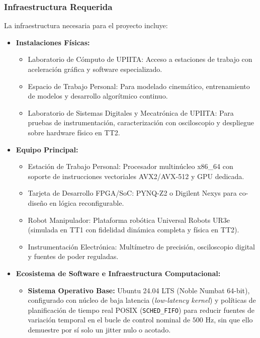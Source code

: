 \documentclass[12pt]{article}
\begin{document}
\subsubsection*{Infraestructura Requerida}
\label{sssec:infraestructura_requerida_listas}
La infraestructura necesaria para el proyecto incluye:

\begin{itemize}
    \item \textbf{Instalaciones Físicas:}
        \begin{itemize}
            \item Laboratorio de Cómputo de UPIITA: Acceso a estaciones de trabajo con aceleración gráfica y software especializado.
            \item Espacio de Trabajo Personal: Para modelado cinemático, entrenamiento de modelos y desarrollo algorítmico continuo.
            \item Laboratorio de Sistemas Digitales y Mecatrónica de UPIITA: Para pruebas de instrumentación, caracterización con osciloscopio y despliegue sobre hardware físico en TT2.
        \end{itemize}
    \item \textbf{Equipo Principal:}
        \begin{itemize}
            \item Estación de Trabajo Personal: Procesador multinúcleo x86\_64 con soporte de instrucciones vectoriales AVX2/AVX-512 y GPU dedicada.
            \item Tarjeta de Desarrollo FPGA/SoC: PYNQ-Z2 o Digilent Nexys para co-diseño en lógica reconfigurable.
            \item Robot Manipulador: Plataforma robótica Universal Robots UR3e (simulada en TT1 con fidelidad dinámica completa y física en TT2).
            \item Instrumentación Electrónica: Multímetro de precisión, osciloscopio digital y fuentes de poder reguladas.
        \end{itemize}
    \item \textbf{Ecosistema de Software e Infraestructura Computacional:}
        \begin{itemize}
            \item \textbf{Sistema Operativo Base:} Ubuntu 24.04 LTS (Noble Numbat 64-bit), configurado con núcleo de baja latencia (\textit{low-latency kernel}) y políticas de planificación de tiempo real POSIX (\texttt{SCHED\_FIFO}) para reducir fuentes de variación temporal en el bucle de control nominal de $500\text{ Hz}$, sin que ello demuestre por sí solo un jitter nulo o acotado.

\end{itemize}
\end{itemize}
\end{document}
